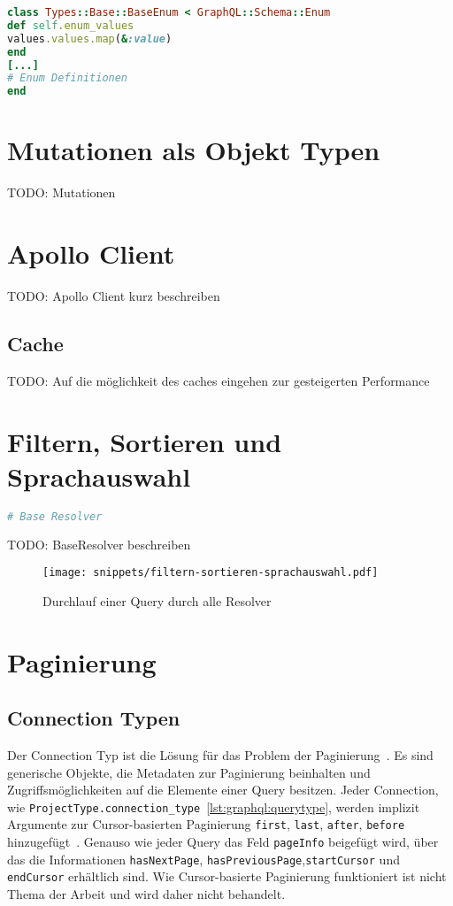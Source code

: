 \begin{lstlisting}[language=Ruby,float=h!,caption={Funktion zum Extrahieren der Enum Werte in ein Array. \lstinline|/graphql/types/base/base_enum.rb|}, label={lst:graphql:enum_values}]
class Types::Base::BaseEnum < GraphQL::Schema::Enum
def self.enum_values
values.values.map(&:value)
end
[...]
# Enum Definitionen
end
\end{lstlisting}
\section{Mutationen als Objekt Typen}
TODO: Mutationen


\section{Apollo Client}
TODO: Apollo Client kurz beschreiben
\subsection{Cache}
TODO: Auf die möglichkeit des caches eingehen zur gesteigerten Performance

\section{Filtern, Sortieren und Sprachauswahl}
\begin{lstlisting}[language=Ruby,float=h!,caption={ \lstinline|/graphql/resolvers/base_resolver.rb|}, label={lst:graphql:base_resolver}]
# Base Resolver
\end{lstlisting}

TODO: BaseResolver beschreiben
\begin{figure}[h!]
	\centering
	\texttt{[image: snippets/filtern-sortieren-sprachauswahl.pdf]}
	\caption{Durchlauf einer Query durch alle Resolver}
	\label{graphql:evolution}
\end{figure}

\section{Paginierung}
\subsection{Connection Typen}
\label{graphql:connections}
Der Connection Typ ist die Lösung für das Problem der Paginierung~\cite{graphql-connection-concept}.
Es sind generische Objekte, die Metadaten zur Paginierung beinhalten und Zugriffsmöglichkeiten auf die Elemente
einer Query besitzen.
Jeder Connection, wie \lstinline|ProjectType.connection_type|~\ref{lst:graphql:querytype}, werden implizit Argumente zur Cursor-basierten Paginierung \lstinline|first|, \lstinline|last|, \lstinline|after|, \lstinline|before| hinzugefügt~\cite{graphql-relay-connection}. Genauso wie jeder Query das Feld \lstinline|pageInfo| beigefügt wird, über das die Informationen \lstinline|hasNextPage|, \lstinline|hasPreviousPage|,\lstinline|startCursor| und \lstinline|endCursor| erhältlich sind. Wie Cursor-basierte Paginierung funktioniert ist nicht Thema der Arbeit und wird daher nicht behandelt.

